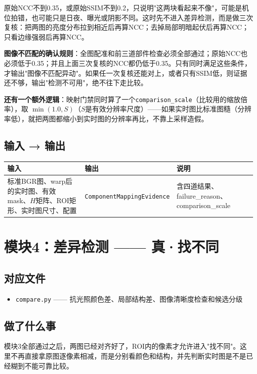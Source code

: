\documentclass[12pt,a4paper]{ctexart}
\begin{document}
原始NCC不到0.35，或原始SSIM不到0.2，只说明"这两块看起来不像"，可能是机位拍错，也可能只是日夜、曝光或阴影不同。这时先不进入差异检测，而是做三次复核：把两图的亮度分布拉到相近后再算NCC；去掉局部明暗起伏后再算NCC；只看边缘强弱后再算NCC。

\textbf{图像不匹配的确认规则}：全图配准和前三道部件检查必须全部通过；原始NCC也必须低于0.35；并且上面三次复核的NCC都仍低于0.35。只有同时满足这些条件，才输出"图像不匹配异动"。如果任一次复核还能对上，或者只有SSIM低，则证据还不够，输出"检测不可用"，绝不往下走比较。

\textbf{还有一个额外逻辑}：映射门禁同时算了一个\texttt{comparison\_scale}（比较用的缩放倍率），取 $\min(1.0, S)$（$S$是有效分辨率尺度）——如果实时图比标准图糙（分辨率低），就把两图都缩小到实时图的分辨率再比，不靠上采样造假。

\subsection*{输入 → 输出}
\noindent\begin{tabular}{|p{4cm}|p{4cm}|p{5cm}|}
\hline
\textbf{输入} & \textbf{输出} & \textbf{说明} \\
\hline
标准BGR图、warp后的实时图、有效mask、$H$矩阵、ROI矩形、实时图尺寸、配置 & \texttt{ComponentMappingEvidence} & 含四道结果、failure\_reason、comparison\_scale \\
\hline
\end{tabular}


\section{模块4：差异检测 —— 真·找不同}

\subsection*{对应文件}
\begin{itemize}
\item \texttt{compare.py} —— 抗光照颜色差、局部结构差、图像清晰度检查和候选分级
\end{itemize}

\subsection*{做了什么事}

模块3全部通过之后，两图已经对齐好了，ROI内的像素才允许进入"找不同"。这里不再直接拿原图逐像素相减，而是分别看颜色和结构，并先判断实时图是不是已经糊到不能可靠比较。
\end{document}
